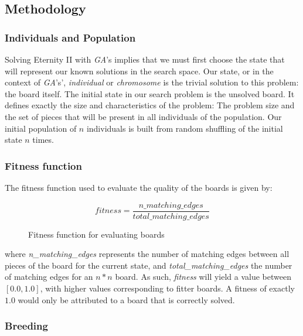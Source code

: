 \documentclass{llncs}
\begin{document}
\subsection{Methodology}\label{sec:methodology}

\subsubsection{Individuals and Population}

Solving Eternity II with \textit{GA}'s implies that we must first choose the state that will represent our known solutions in the search space. Our state, or in the context of \textit{GA}'s', \textit{individual} or \textit{chromosome} is the trivial solution to this problem: the board itself.
The initial state in our search problem is the unsolved board. It defines exactly the size and characteristics of the problem: The problem size and the set of pieces that will be present in all individuals of the population.
Our initial population of $n$ individuals is built from random shuffling of the initial state $n$ times.

\subsubsection{Fitness function}\label{sec:fitness-function}

The fitness function used to evaluate the quality of the boards is given by:

\begin{figure}[h]
	\begin{equation}
		fitness = \frac{n\_matching\_edges}{total\_matching\_edges}
	\end{equation}
	\caption{Fitness function for evaluating boards}
	\label{fig:eq:fitness_function}
\end{figure}

where \textit{n\_matching\_edges} represents the number of matching edges between all pieces of the board for the current state, and \textit{total\_matching\_edges} the number of matching edges for an $n*n$ board. As such, \textit{fitness} will yield a value between $[0.0, 1.0]$, with higher values corresponding to fitter boards. A fitness of exactly $1.0$ would only be attributed to a board that is correctly solved.

\subsubsection{Breeding}\label{sec:breeding}
\end{document}

